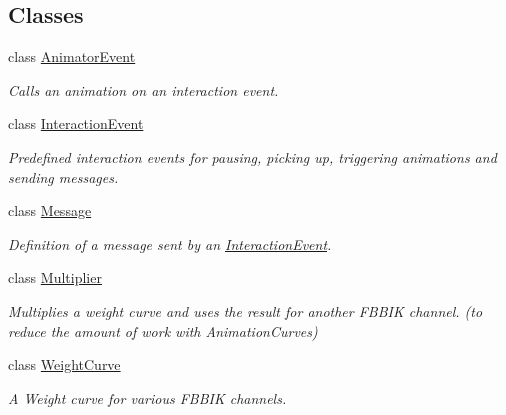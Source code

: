 \subsection*{Classes}
\begin{DoxyCompactItemize}
\item 
class \mbox{\hyperlink{class_root_motion_1_1_final_i_k_1_1_interaction_object_1_1_animator_event}{Animator\+Event}}
\begin{DoxyCompactList}\small\item\em Calls an animation on an interaction event. \end{DoxyCompactList}\item 
class \mbox{\hyperlink{class_root_motion_1_1_final_i_k_1_1_interaction_object_1_1_interaction_event}{Interaction\+Event}}
\begin{DoxyCompactList}\small\item\em Predefined interaction events for pausing, picking up, triggering animations and sending messages. \end{DoxyCompactList}\item 
class \mbox{\hyperlink{class_root_motion_1_1_final_i_k_1_1_interaction_object_1_1_message}{Message}}
\begin{DoxyCompactList}\small\item\em Definition of a message sent by an \mbox{\hyperlink{class_root_motion_1_1_final_i_k_1_1_interaction_object_1_1_interaction_event}{Interaction\+Event}}. \end{DoxyCompactList}\item 
class \mbox{\hyperlink{class_root_motion_1_1_final_i_k_1_1_interaction_object_1_1_multiplier}{Multiplier}}
\begin{DoxyCompactList}\small\item\em Multiplies a weight curve and uses the result for another F\+B\+B\+IK channel. (to reduce the amount of work with Animation\+Curves) \end{DoxyCompactList}\item 
class \mbox{\hyperlink{class_root_motion_1_1_final_i_k_1_1_interaction_object_1_1_weight_curve}{Weight\+Curve}}
\begin{DoxyCompactList}\small\item\em A Weight curve for various F\+B\+B\+IK channels. \end{DoxyCompactList}\end{DoxyCompactItemize}
